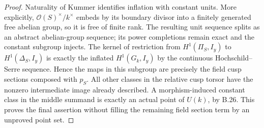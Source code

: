 \begin{proof}
Naturality of Kummer identifies inflation with
constant units. More explicitly,
$\mathcal O(S)^\times/k^\times$ embeds by its
boundary divisor into a finitely generated
free abelian group, so it is free of finite
rank. The resulting unit sequence splits as
an abstract abelian-group sequence; its power
completions remain exact and the constant
subgroup injects. The kernel of restriction
from $H^1(\Pi_S,I_y)$ to $H^1(\Delta_S,I_y)$
is exactly the inflated $H^1(G_k,I_y)$ by
the continuous Hochschild--Serre sequence.
Hence the maps in this subgroup are precisely
the field cusp sections composed with $p_S$.
All other classes in the relative cusp torsor
have the nonzero intermediate image already
described. A morphism-induced constant class
in the middle summand is exactly an actual
point of $U(k)$, by B.26. This proves the final
assertion without filling the remaining field
section term by an unproved point set.
\end{proof}

